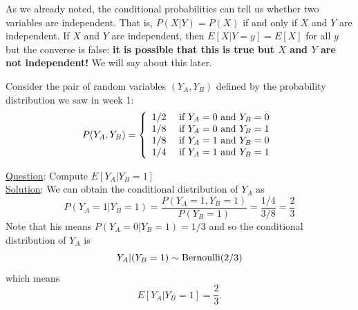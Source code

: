  As we already noted, the conditional probabilities can tell us whether two variables are independent. That is, $P(X|Y) = P(X)$ if and only if $X$ and $Y$ are independent. If $X$ and $Y$ are independent, then $E[X|Y=y]= E[X]$ for all $y$ but the converse is false: {\bf it is possible that this is true but $X$ and $Y$ are not independent!} We will say about this later.  




\begin{example}
Consider the pair of random variables $(Y_A,Y_B)$ defined by the probability distribution we saw in week 1:
\begin{equation}\label{eq:gene}
P(Y_A,Y_B) = \left\{ \begin{array}{cc}
1/2 & \text{ if }Y_A=0 \text{ and } Y_B = 0\\
1/8 & \text{ if }Y_A=0 \text{ and } Y_B = 1\\
1/8 & \text{ if }Y_A=1 \text{ and } Y_B = 0\\
1/4 & \text{ if }Y_A=1 \text{ and } Y_B = 1\\
\end{array}
 \right.\\
\end{equation}


\noindent
\underline{Question}: Compute $E[Y_A|Y_B=1]$\\

\noindent
\underline{Solution}: We can obtain the conditional distribution of $Y_A$ as 
\begin{equation*}
P(Y_A=1|Y_B = 1) = \frac{P(Y_A=1,Y_B=1)}{P(Y_B=1)} = \frac{1/4}{3/8} = \frac{2}{3}
\end{equation*}
Note that his means $P(Y_A=0|Y_B = 1) = 1/3$ and so the conditional distribution of  $Y_A$ is 
\begin{equation*}
Y_A|(Y_B=1) \sim {\rm Bernoulli}(2/3)
\end{equation*}
which means 
\begin{equation*}
E[Y_A|Y_B=1] = \frac{2}{3}.
\end{equation*}

\end{example}

